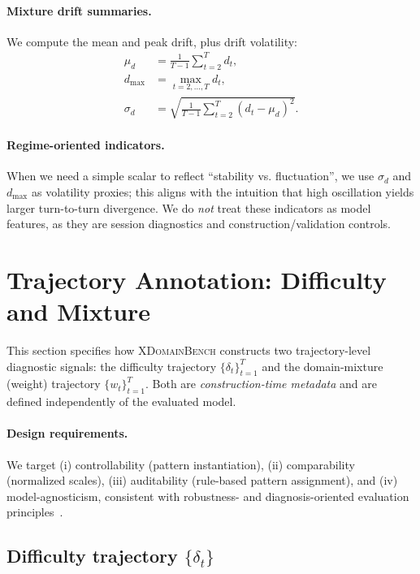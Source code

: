\paragraph{Mixture drift summaries.}
We compute the mean and peak drift, plus drift volatility:
\begin{align}
\label{eq:ep_drift_mean}
\mu_d &= \frac{1}{T-1}\sum_{t=2}^{T} d_t,\\
\label{eq:ep_drift_max}
d_{\max} &= \max_{t=2,\ldots,T} d_t,\\
\label{eq:ep_drift_std}
\sigma_d &= \sqrt{\frac{1}{T-1}\sum_{t=2}^{T}\left(d_t-\mu_d\right)^2 }.
\end{align}

\paragraph{Regime-oriented indicators.}
When we need a simple scalar to reflect ``stability vs. fluctuation'',
we use $\sigma_d$ and $d_{\max}$ as volatility proxies; this aligns with the intuition that high oscillation yields larger turn-to-turn divergence.
We do \emph{not} treat these indicators as model features, as they are session diagnostics and construction/validation controls.


\section{Trajectory Annotation: Difficulty and Mixture}
\label{app:trajectory_annotation}

This section specifies how \textsc{XDomainBench} constructs two trajectory-level diagnostic signals:
the difficulty trajectory $\{\delta_t\}_{t=1}^{T}$ and the domain-mixture (weight) trajectory $\{w_t\}_{t=1}^{T}$.
Both are \emph{construction-time metadata} and are defined independently of the evaluated model.

\paragraph{Design requirements.}
We target (i) controllability (pattern instantiation), (ii) comparability (normalized scales), (iii) auditability (rule-based pattern assignment), and (iv) model-agnosticism, consistent with robustness- and diagnosis-oriented evaluation principles~\citep{liang2022helm,kiela-etal-2021-dynabench,ribeiro-etal-2020-beyond}.

\subsection{Difficulty trajectory $\{\delta_t\}$}
\label{app:difficulty_trajectory}

